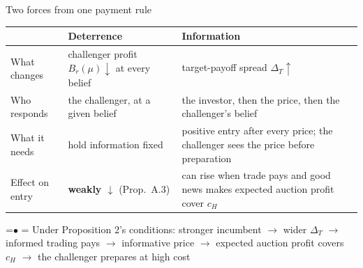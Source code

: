 \documentclass[10pt,aspectratio=169]{beamer}
\newcommand{\Status}[1]{{\color{cGrayText}\scriptsize #1}}
\newcommand{\Info}[1]{\textcolor{cInfo}{#1}}
\newcommand{\Cost}[1]{\textcolor{cCost}{#1}}
\newcommand{\TakeawayBody}[1]{\begin{minipage}{\textwidth}\raggedright\normalsize
    \setbox0=\hbox{{\usebeamercolor[fg]{structure}\raise0.7pt\hbox{\scriptsize$\bullet$}}\hspace{0.55em}}%
    \hangindent=\wd0 \hangafter=1 \noindent\box0 #1\par
  \end{minipage}}
\renewcommand{\Takeaway}[2][\ExhibitReadingGap]{\par\vspace{#1}\noindent\TakeawayBody{#2}\par}
\newcommand{\NavGap}{\par\vspace{0.45cm}}%
\let\AdapterBackButton\BackButton
\renewcommand{\BackButton}[1]{\NavGap\AdapterBackButton{#1}}%
\begin{document}
\begin{frame}[label=A18]{Two forces from one payment rule}
\hypertarget{app:forces}{}
\vspace{4pt}
\begin{center}\small
\renewcommand{\arraystretch}{1.2}
\begin{tabular}{@{}>{\raggedright\arraybackslash}p{3.3cm}>{\raggedright\arraybackslash}p{4.4cm}>{\raggedright\arraybackslash}p{5.6cm}@{}}
\toprule
 & Deterrence & \Info{Information}\\
\midrule
What changes & challenger profit $B_r(\mu)\downarrow$ at every belief & \Info{target-payoff spread $\Delta_T\uparrow$}\\
Who responds & the challenger, at a given belief & the investor, then the price, then the challenger's belief\\
What it needs & hold information fixed & positive entry after every price; the challenger sees the price before preparation\\
Effect on entry & \textbf{weakly $\downarrow$} \Status{(Prop.~A.3)} & can rise when trade pays and good news makes expected auction profit cover \Cost{$c_H$}\\
\bottomrule
\end{tabular}
\end{center}
\Takeaway{Under Proposition 2's conditions: \Info{stronger incumbent $\to$ wider $\Delta_T$ $\to$ informed trading pays $\to$ informative price $\to$ expected auction profit covers} \Cost{$c_H$} \Info{$\to$ the challenger prepares at high cost}}
\end{frame}
\end{document}

